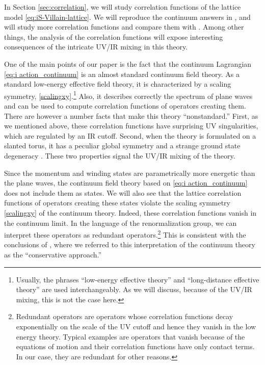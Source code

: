 \documentclass[12pt]{article}
\numberwithin{equation}{section}
\begin{document}
In Section \ref{sec:correlation}, we will study correlation functions of the lattice model \eqref{eq:iS-Villain-lattice}.    We will reproduce the continuum answers in \cite{paper1}, and will study more correlation functions and compare them with \cite{PhysRevB.66.054526}. Among other things, the analysis of the correlation functions will expose interesting consequences of the intricate UV/IR mixing in this theory.




One of the main points of our paper is the fact that the continuum Lagrangian \eqref{eq:i action_continuum} is an almost standard continuum field theory.  As a standard low-energy effective field theory, it is characterized by a scaling symmetry, \eqref{scalingxy}.\footnote{Usually, the phrases ``low-energy effective theory'' and ``long-distance effective theory'' are used interchangeably.  As we will discuss, because of the UV/IR mixing, this is not the case here.}  Also, it describes correctly the spectrum of plane waves and can be used to compute correlation functions of operators creating them.  There are however a number facts that make this theory ``nonstandard.''  First, as we mentioned above, these correlation functions have surprising UV singularities, which are regulated by an IR cutoff.  Second, when the theory is formulated on a slanted torus, it has a peculiar global symmetry and a strange ground state degeneracy \cite{Rudelius:2020kta}.  These two properties signal the UV/IR mixing of the theory.

Since the momentum and winding states are parametrically more energetic than the plane waves, the continuum field theory based on \eqref{eq:i action_continuum} does not include them as states.
We will also see that the lattice correlation functions of operators creating these states violate the scaling symmetry \eqref{scalingxy} of the continuum theory.  Indeed, these correlation functions vanish in the continuum limit. In the language of the renormalization group, we can interpret these operators as redundant operators.\footnote{Redundant operators are operators whose correlation functions decay exponentially on the scale of the UV cutoff and hence they vanish in the low energy theory.  Typical examples are operators that vanish because of the equations of motion and their correlation functions have only contact terms.  In our case, they are redundant for other reasons.}
This is consistent with the conclusions of \cite{paper1}, where we referred to this interpretation of the continuum theory as the ``conservative approach.''
\end{document}
